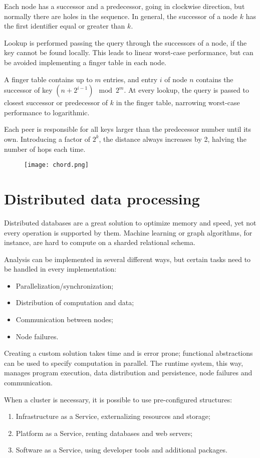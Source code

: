 Each node has a successor and a predecessor, going in clockwise direction, but normally there are holes in the sequence. In general, the successor of a node $k$ has the first identifier equal or greater than $k$.

Lookup is performed passing the query through the successors of a node, if the key cannot be found locally. This leads to linear worst-case performance, but can be avoided implementing a finger table in each node. 

A finger table contains up to $m$ entries, and entry $i$ of node $n$ contains the successor of key $(n + 2^{i-1}) \mod 2^m$. At every lookup, the query is passed to closest successor or predecessor of $k$ in the finger table, narrowing worst-case performance to logarithmic.

Each peer is responsible for all keys larger than the predecessor number until its own. Introducing a factor of $2^k$, the distance always increases by 2, halving the number of hops each time.

\begin{figure}[h]
	\texttt{[image: chord.png]}
	\centering
\end{figure}

\section{Distributed data processing}
Distributed databases are a great solution to optimize memory and speed, yet not every operation is supported by them. Machine learning or graph algorithms, for instance, are hard to compute on a sharded relational schema.

Analysis can be implemented in several different ways, but certain tasks need to be handled in every implementation:
\begin{itemize}
	\item Parallelization/synchronization;
	\item Distribution of computation and data;
	\item Communication between nodes;
	\item Node failures.
\end{itemize}

Creating a custom solution takes time and is error prone; functional abstractions can be used to specify computation in parallel. The runtime system, this way, manages program execution, data distribution and persistence, node failures and communication.

When a cluster is necessary, it is possible to use pre-configured structures:
\begin{enumerate}
	\item Infrastructure as a Service, externalizing resources and storage;
	\item Platform as a Service, renting databases and web servers;
	\item Software as a Service, using developer tools and additional packages.
\end{enumerate}

